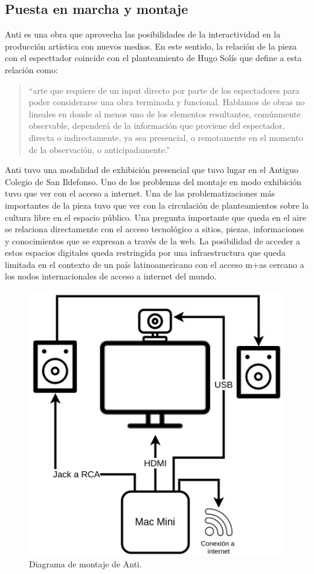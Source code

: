 \subsection{Puesta en marcha y montaje}

Anti es una obra que aprovecha las posibilidades de la interactividad en la producción artística con nuevos medios. En este sentido, la relación de la pieza con el especttador coincide con el planteamiento de Hugo Solís que define a esta relación como:

\begin{quote}

``arte que requiere de un input directo por parte de los espectadores para poder considerarse una obra terminada y funcional. Hablamos de obras no lineales en donde al menos uno de los elementos resultantes, comúnmente observable, dependerá de la información que proviene del espectador, directa o indirectamente, ya sea presencial, o remotamente en el momento de la observación, o anticipadamente.''\citep[p.~37]{hugoSolis}

\end{quote}
  
Anti tuvo una modalidad de exhibición presencial que tuvo lugar en el Antiguo Colegio de San Ildefonso. Uno de los problemas del montaje en modo exhibición tuvo que ver con el acceso a internet. Una de las problematizaciones más importantes de la pieza tuvo que ver con la circulación de planteamientos sobre la cultura libre en el espacio público. Una pregunta importante que queda en el aire se relaciona directamente con el acceso tecnológico a sitios, piezas, informaciones y conocimientos que se expresan a través de la web. La posibilidad de acceder a estos espacios digitales queda restringida por una infraestructura que queda limitada en el contexto de un país latinoamericano con el acceso m+as cercano a los nodos internacionales de acceso a internet del mundo. 

\begin{figure}[tb]
\centering 
\includegraphics[width=0.7\columnwidth]{../img/antiExWhite.png} 
\caption[Diagrama de Montaje Anti]{Diagrama de montaje de Anti.} %
\label{fig:gallery} 
\end{figure}

